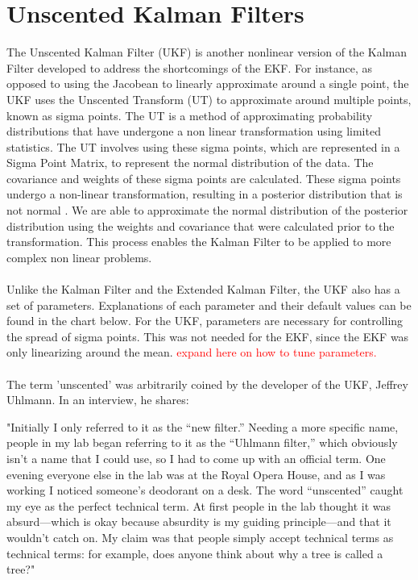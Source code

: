 \chapter{Unscented Kalman Filters}
\label{Unscented Kalman Filters}

The Unscented Kalman Filter (UKF) is another nonlinear version of the Kalman Filter developed to address the shortcomings of the EKF. For instance, as opposed to using the Jacobean to linearly approximate around a single point, the UKF uses the Unscented Transform (UT) to approximate around multiple points, known as sigma points. The UT is a method of approximating probability distributions that have undergone a non linear transformation using limited statistics. The UT involves using these sigma points, which are represented in a Sigma Point Matrix, to represent the normal distribution of the data. The covariance and weights of these sigma points are calculated. These sigma points undergo a non-linear transformation, resulting in a posterior distribution that is not normal \cite{inbook, Wan01theunscented} . We are able to approximate the normal distribution of the posterior distribution using the weights and covariance that were calculated prior to the transformation. This process enables the Kalman Filter to be applied to more complex non linear problems. \\ \\
Unlike the Kalman Filter and the Extended Kalman Filter, the UKF also has a set of parameters. Explanations of each parameter and their default values can be found in the chart below. For the UKF, parameters are necessary for controlling the spread of sigma points. This was not needed for the EKF, since the EKF was only linearizing around the mean.
\textcolor{red}{expand here on how to tune parameters.} \\ \\
The term 'unscented' was arbitrarily coined by the developer of the UKF, Jeffrey Uhlmann. In an interview, he shares:
\begin{displayquote}
"Initially I only referred to it as the “new filter.” Needing a more specific name, people in my lab began referring to it as the “Uhlmann filter,” which obviously isn’t a name that I could use, so I had to come up with an official term. One evening everyone else in the lab was at the Royal Opera House, and as I was working I noticed someone’s deodorant on a desk. The word “unscented” caught my eye as the perfect technical term. At first people in the lab thought it was absurd—which is okay because absurdity is my guiding principle—and that it wouldn’t catch on. My claim was that people simply accept technical terms as technical terms: for example, does anyone think about why a tree is called a tree?"
\end{displayquote}

